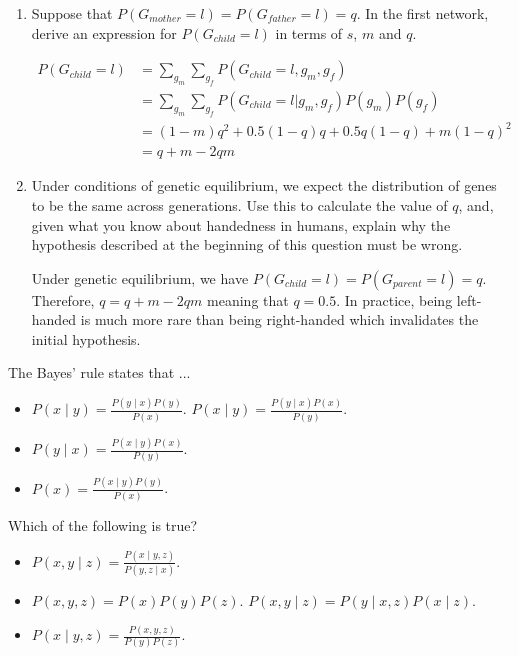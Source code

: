 \documentclass[11pt, a4paper]{article}
\begin{document}
\begin{enumerate}
    \item Suppose that $P(G_{mother} = l) = P(G_{father} = l) = q$. In the first network, derive an expression for $P(G_{child} = l)$ in terms of $s$, $m$ and $q$.
    \begin{solution}
        \begin{align*}
            P(G_{child} = l) & = \sum_{g_m} \sum_{g_f} P(G_{child} = l, g_m, g_f) \\
            & = \sum_{g_m} \sum_{g_f} P(G_{child} = l | g_m, g_f) P(g_m) P(g_f) \\
            & = (1 - m) q^2 + 0.5 (1 - q) q + 0.5 q (1 - q) + m (1 - q)^2 \\
            & = q + m - 2qm
        \end{align*}
    \end{solution}

    \item Under conditions of genetic equilibrium, we expect the distribution of genes to be the same across generations. Use this to calculate the value of $q$, and, given what you know about handedness in humans, explain why the hypothesis described at the beginning of this question must be wrong.

    \begin{solution}
        Under genetic equilibrium, we have $P(G_{child} = l) = P(G_{parent} = l) = q$. Therefore, $q = q + m - 2 q m$ meaning that $q = 0.5$. In practice, being left-handed is much more rare than being right-handed which invalidates the initial hypothesis.
    \end{solution}
\end{enumerate}

\startquiz

The Bayes’ rule states that ...
\begin{itemize}
    \item $P(x\mid y) = \frac{P(y\mid x)P(y)}{P(x)}$.
    \solitem $P(x\mid y) = \frac{P(y\mid x)P(x)}{P(y)}$.
    \item $P(y\mid x) = \frac{P(x\mid y)P(x)}{P(y)}$.
    \item $P(x) = \frac{P(x\mid y)P(y)}{P(x)}$.
\end{itemize}

Which of the following is true?
\begin{itemize}
    \item $P(x, y \mid z) = \frac{P(x \mid y,z)}{P(y,z \mid x)}$.
    \item $P(x, y, z) = P(x)P(y)P(z)$.
    \solitem $P(x, y \mid z) = P(y\mid x,z)P(x\mid z)$. 
    \item $P(x\mid y,z) = \frac{P(x,y,z)}{P(y)P(z)}$.
\end{itemize}
\end{document}
